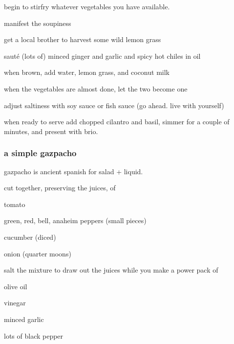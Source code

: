 \begin{algorithm}
  \item begin to stirfry whatever vegetables you have available.

  \item manifest the soupiness

  \begin{algorithm}
    \item get a local brother to harvest some wild lemon grass

    \item saut\'{e} (lots of) minced ginger and garlic and spicy hot
    chiles in oil
    
    \item when brown, add water, lemon grass, and coconut milk
  \end{algorithm}

  \item when the vegetables are almost done, let the two become one

  \item adjust saltiness with soy sauce or fish sauce (go ahead. live
  with yourself)

  \item when ready to serve add chopped cilantro and basil, simmer for
  a couple of minutes, and present with brio.
\end{algorithm}

\subsubsection{a simple gazpacho}

gazpacho is ancient spanish for salad + liquid.

cut together, preserving the juices, of
\begin{ingredients}
  \item tomato
  \item green, red, bell, anaheim peppers (small pieces)
  \item cucumber (diced)
  \item onion (quarter moons)
\end{ingredients}

salt the mixture to draw out the juices while you make a power pack of
\begin{ingredients}	
  \item olive oil
  \item vinegar
  \item minced garlic
  \item lots of black pepper
\end{ingredients}

